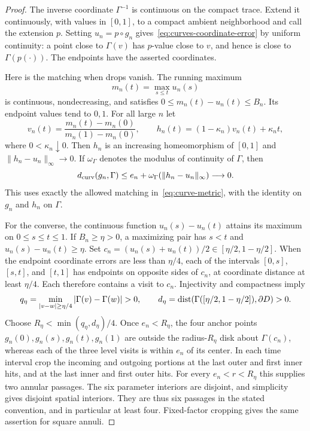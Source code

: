 \begin{proof}
The inverse coordinate $\Gamma^{-1}$ is continuous on the compact
trace.  Extend it continuously, with values in $[0,1]$, to a compact
ambient neighborhood and call the extension $p$.  Setting
$u_n=p\circ g_n$ gives~\eqref{eq:curves-coordinate-error} by uniform
continuity: a point close to $\Gamma(v)$ has $p$-value close to $v$,
and hence is close to $\Gamma(p(\cdot))$.  The endpoints have the
asserted coordinates.

Here is the matching when drops vanish.  The running maximum
\[
 m_n(t)=\max_{s\leq t}u_n(s)
\]
is continuous, nondecreasing, and satisfies
$0\leq m_n(t)-u_n(t)\leq B_n$.  Its endpoint values tend to $0,1$.
For all large $n$ let
\[
 v_n(t)=\frac{m_n(t)-m_n(0)}{m_n(1)-m_n(0)},\qquad
 h_n(t)=(1-\kappa_n)v_n(t)+\kappa_n t,
\]
where $0<\kappa_n\downarrow0$.  Then $h_n$ is an increasing
homeomorphism of $[0,1]$ and $\|h_n-u_n\|_\infty\to0$.  If
$\omega_\Gamma$ denotes the modulus of continuity of $\Gamma$, then
\[
 d_{\rm curv}(g_n,\Gamma)
 \leq e_n+\omega_\Gamma(\|h_n-u_n\|_\infty)\longrightarrow0.
\]
This uses exactly the allowed matching in~\eqref{eq:curve-metric},
with the identity on $g_n$ and $h_n$ on $\Gamma$.

For the converse, the continuous function $u_n(s)-u_n(t)$ attains its
maximum on $0\leq s\leq t\leq1$.  If $B_n\geq\eta>0$, a maximizing
pair has $s<t$ and $u_n(s)-u_n(t)\geq\eta$.  Set
$c_n=(u_n(s)+u_n(t))/2\in[\eta/2,1-\eta/2]$.  When the endpoint
coordinate errors are less than $\eta/4$, each of the intervals
$[0,s]$, $[s,t]$, and $[t,1]$ has endpoints on opposite sides of
$c_n$, at coordinate distance at least $\eta/4$.  Each therefore
contains a visit to $c_n$.  Injectivity and compactness imply
\[
 q_\eta=\min_{|v-w|\geq\eta/4}|\Gamma(v)-\Gamma(w)|>0,
 \qquad
 d_\eta=\dist(\Gamma([\eta/2,1-\eta/2]),\partial D)>0.
\]
Choose $R_\eta<\min(q_\eta,d_\eta)/4$.  Once $e_n<R_\eta$, the
four anchor points $g_n(0),g_n(s),g_n(t),g_n(1)$ are outside the
radius-$R_\eta$ disk about $\Gamma(c_n)$, whereas each of the three
level visits is within $e_n$ of its center.  In each time interval crop
the incoming and outgoing portions at the last outer and first inner
hits, and at the last inner and first outer hits.  For every
$e_n<r<R_\eta$ this supplies two annular passages.  The six parameter
interiors are disjoint, and simplicity gives disjoint spatial interiors.
They are thus six passages in the stated convention, and in particular
at least four.  Fixed-factor cropping gives the same assertion for
square annuli.


\end{proof}

